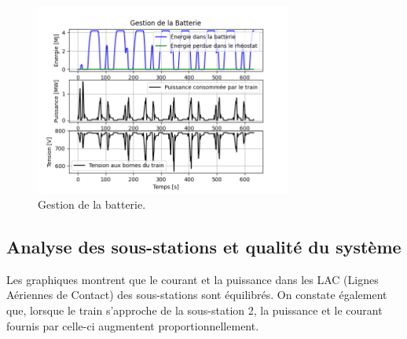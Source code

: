 \documentclass[11pt, a4paper, oneside, portrait]{report}
\begin{document}
            \begin{figure}[H]
                \centering
                \includegraphics[width=0.75\textwidth]{Figures/Bat.png}
                \caption{Gestion de la batterie.}
                \label{fig:Bat}
            \end{figure}

            \subsection*{Analyse des sous-stations et qualité du système}
            Les graphiques montrent que le courant et la puissance dans les LAC (Lignes Aériennes de
            Contact) des sous-stations sont équilibrés. On constate également que, lorsque le train
            s’approche de la sous-station 2, la puissance et le courant fournis par celle-ci augmentent
            proportionnellement.
\end{document}
